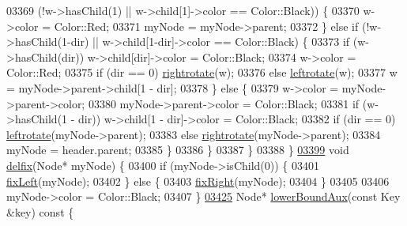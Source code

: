 \begin{DoxyCode}
03369                         (!w->hasChild(1) || w->child[1]->color == Color::Black)) \{
03370                         w->color = Color::Red;
03371                         myNode = myNode->parent;
03372                     \} \textcolor{keywordflow}{else} \textcolor{keywordflow}{if} (!w->hasChild(1-dir) || w->child[1-dir]->color == Color::Black) \{
03373                         \textcolor{keywordflow}{if} (w->hasChild(dir)) w->child[dir]->color = Color::Black;
03374                         w->color = Color::Red;
03375                         if (dir == 0) \hyperlink{classaed2_1_1map_a816d69fa4dfe18a984dc3628fee14e2f_a816d69fa4dfe18a984dc3628fee14e2f}{rightrotate}(w);
03376                         \textcolor{keywordflow}{else} \hyperlink{classaed2_1_1map_ad764851f1534f2db0964c4f729056a1e_ad764851f1534f2db0964c4f729056a1e}{leftrotate}(w);
03377                         w = myNode->parent->child[1 - dir];
03378                     \} \textcolor{keywordflow}{else} \{
03379                         w->color = myNode->parent->color;
03380                         myNode->parent->color = Color::Black;
03381                         \textcolor{keywordflow}{if} (w->hasChild(1 - dir)) w->child[1 - dir]->color = Color::Black;
03382                         if (dir == 0) \hyperlink{classaed2_1_1map_ad764851f1534f2db0964c4f729056a1e_ad764851f1534f2db0964c4f729056a1e}{leftrotate}(myNode->parent);
03383                         \textcolor{keywordflow}{else} \hyperlink{classaed2_1_1map_a816d69fa4dfe18a984dc3628fee14e2f_a816d69fa4dfe18a984dc3628fee14e2f}{rightrotate}(myNode->parent);
03384                         myNode = header.parent;
03385                     \}
03386                 \}
03387             \}
03388         \}
\hypertarget{map_8h_source.tex_l03399}{}\hyperlink{classaed2_1_1map_a056322ff63d37b43d042ffa0378c9fd2_a056322ff63d37b43d042ffa0378c9fd2}{03399}         \textcolor{keywordtype}{void} \hyperlink{classaed2_1_1map_a056322ff63d37b43d042ffa0378c9fd2_a056322ff63d37b43d042ffa0378c9fd2}{delfix}(Node* myNode) \{
03400             \textcolor{keywordflow}{if} (myNode->isChild(0)) \{
03401                 \hyperlink{classaed2_1_1map_ae69c26a9d27f538124cd827646e56feb_ae69c26a9d27f538124cd827646e56feb}{fixLeft}(myNode);
03402             \} \textcolor{keywordflow}{else} \{
03403                 \hyperlink{classaed2_1_1map_ae908761d06411046290cf49a5e0618bd_ae908761d06411046290cf49a5e0618bd}{fixRight}(myNode);
03404             \}
03405 
03406             myNode->color = Color::Black;
03407         \}
\hypertarget{map_8h_source.tex_l03425}{}\hyperlink{classaed2_1_1map_a7690a8432874bad5f6cab403c1804bba_a7690a8432874bad5f6cab403c1804bba}{03425}         Node* \hyperlink{classaed2_1_1map_a7690a8432874bad5f6cab403c1804bba_a7690a8432874bad5f6cab403c1804bba}{lowerBoundAux}(\textcolor{keyword}{const} Key &key)\textcolor{keyword}{ const }\{

\end{DoxyCode}
